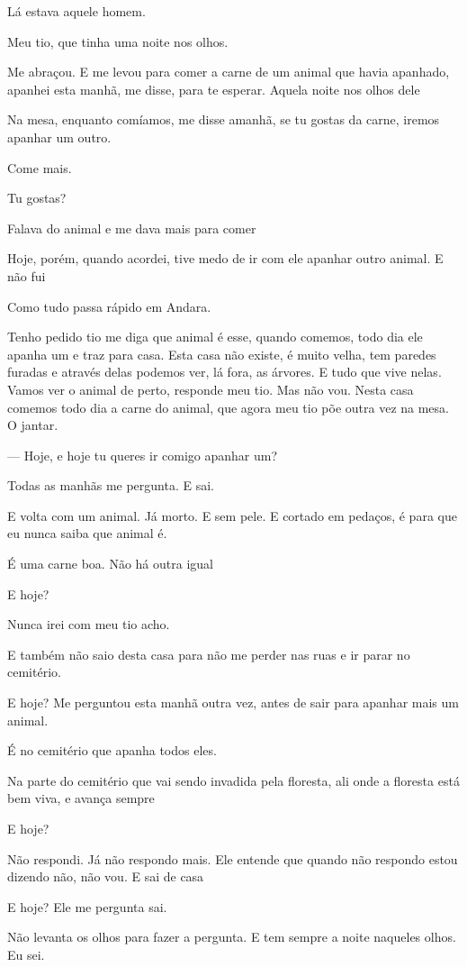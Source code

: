 Lá estava aquele homem.

Meu tio, que tinha uma noite nos olhos.

Me abraçou. E me levou para comer a carne de um animal que havia
apanhado, apanhei esta manhã, me disse, para te esperar. Aquela noite
nos olhos dele

Na mesa, enquanto comíamos, me disse amanhã, se tu gostas da carne,
iremos apanhar um outro.

Come mais.

Tu gostas?

Falava do animal e me dava mais para comer

Hoje, porém, quando acordei, tive medo de ir com ele apanhar outro
animal. E não fui

Como tudo passa rápido em Andara.

Tenho pedido tio me diga que animal é esse, quando comemos, todo dia ele
apanha um e traz para casa. Esta casa não existe, é muito velha, tem
paredes furadas e através delas podemos ver, lá fora, as árvores. E tudo
que vive nelas. Vamos ver o animal de perto, responde meu tio. Mas não
vou. Nesta casa comemos todo dia a carne do animal, que agora meu tio
põe outra vez na mesa. O jantar.

--- Hoje, e hoje tu queres ir comigo apanhar um?

Todas as manhãs me pergunta. E sai.

E volta com um animal. Já morto. E sem pele. E cortado em pedaços, é
para que eu nunca saiba que animal é.

É uma carne boa. Não há outra igual

E hoje?

Nunca irei com meu tio acho.

E também não saio desta casa para não me perder nas ruas e ir parar no
cemitério.

E hoje? Me perguntou esta manhã outra vez, antes de sair para apanhar
mais um animal.

É no cemitério que apanha todos eles.

Na parte do cemitério que vai sendo invadida pela floresta, ali onde a
floresta está bem viva, e avança sempre

E hoje?

Não respondi. Já não respondo mais. Ele entende que quando não respondo
estou dizendo não, não vou. E sai de casa

E hoje? Ele me pergunta sai.

Não levanta os olhos para fazer a pergunta. E tem sempre a noite
naqueles olhos. Eu sei.

